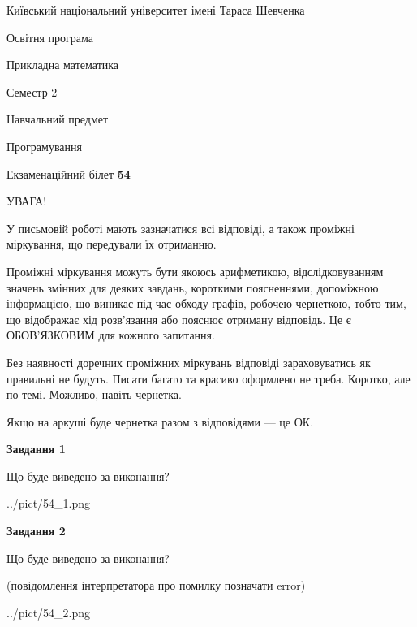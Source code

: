 \documentclass[12pt, ukrainian]{article}
\begin{document}
{{\begin {small}\par
{ \center  Київський національний університет імені Тараса Шевченка \par}
{\parbox {5 cm}{Освітня програма \hfill}{\parbox {7 cm}{Прикладна математика\hfill}}\parbox {6 cm}{\hfill Семестр 2}}\par
{\parbox {5 cm} {Навчальний предмет \hfill}\parbox {7 cm}{Програмування \hfill}\parbox {6cm}{\hfill}\par}\vspace{-7pt} \end{small}}{\center Екзаменаційний білет \No \textbf
{ 54 }\par}}
{
\begin {large}
УВАГА!

У письмовій роботі мають зазначатися всі відповіді, а також проміжні міркування, що передували їх отриманню.

Проміжні міркування можуть бути якоюсь арифметикою, відслідковуванням зна\-чень змінних для деяких завдань,
короткими поясненнями, допоміжною інформацією, що виникає під час обходу графів, робочею чернеткою,
тобто тим, що відображає хід розв’язання або пояснює отриману відповідь.
Це є ОБОВ’ЯЗКОВИМ для кожного запитання.

Без наявності доречних проміжних міркувань відповіді зараховуватись як правиль\-ні не будуть.
Писати багато та красиво оформлено не треба. Коротко, але по темі. Можли\-во, навіть чернетка.

Якщо на аркуші буде чернетка разом з відповідями --- це ОК.

\newpage

{\begin {center}\textbf{Завдання 1}\end {center}}\par
Що буде виведено за виконання?\par
\begin{center}
	{../pict/54_1.png}
\end{center}
\newpage

{\begin {center}\textbf{Завдання 2}\end {center}}\par
Що буде виведено за виконання?\par
 (повідомлення інтерпретатора про помилку позначати error)\par
\begin{center}
	{../pict/54_2.png}
\end{center}
\newpage


\end{large}}
\end{document}
